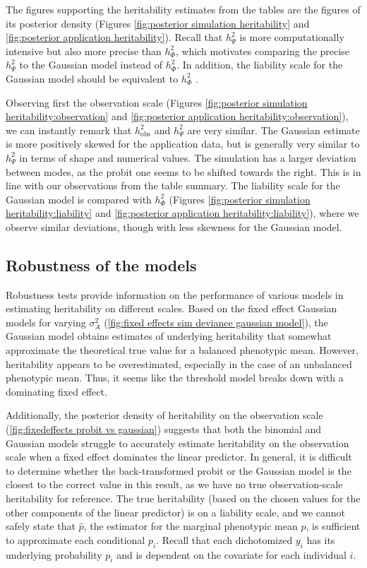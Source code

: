 The figures supporting the heritability estimates from the tables are the figures of its posterior density (Figures \ref{fig:posterior simulation heritability} and \ref{fig:posterior application heritability}). Recall that $h^2_\Psi$ is more computationally intensive but also more precise than $h^2_\Phi$, which motivates comparing the precise $h^2_\Psi$ to the Gaussian model instead of $h^2_\Phi$. In addition, the liability scale for the Gaussian model should be equivalent to $h^2_\Phi$ \autocite{de2016general}.

Observing first the observation scale (Figures \ref{fig:posterior simulation heritability:observation} and \ref{fig:posterior application heritability:observation}), we can instantly remark that $h^2_\text{obs}$ and $h^2_{\Psi}$ are very similar. The Gaussian estimate is more positively skewed for the application data, but is generally very similar to $h^2_\Psi$ in terms of shape and numerical values. The simulation has a larger deviation between modes, as the probit one seems to be shifted towards the right. This is in line with our observations from the table summary. The liability scale for the Gaussian model is compared with $h^2_\Phi$ (Figures \ref{fig:posterior simulation heritability:liability} and \ref{fig:posterior application heritability:liability}), where we observe similar deviations, though with less skewness for the Gaussian model.

\subsection{Robustness of the models}

Robustness tests provide information on the performance of various models in estimating heritability on different scales. Based on the fixed effect Gaussian models for varying $\sigma^2_A$ (\autoref{fig:fixed effects sim deviance gaussian model}), the Gaussian model obtains estimates of underlying heritability that somewhat approximate the theoretical true value for a balanced phenotypic mean. However, heritability appears to be overestimated, especially in the case of an unbalanced phenotypic mean. Thus, it seems like the threshold model breaks down with a dominating fixed effect.

Additionally, the posterior density of heritability on the observation scale (\autoref{fig:fixedeffects probit vs gaussian}) suggests that both the binomial and Gaussian models struggle to accurately estimate heritability on the observation scale when a fixed effect dominates the linear predictor. In general, it is difficult to determine whether the back-transformed probit or the Gaussian model is the closest to the correct value in this result, as we have no true observation-scale heritability for reference. The true heritability (based on the chosen values for the other components of the linear predictor) is on a liability scale, and we cannot safely state that $\hat p$, the estimator for the marginal phenotypic mean $p$, is sufficient to approximate each conditional $p_i$. Recall that each dichotomized $y_i$ has its underlying probability $p_i$ and is dependent on the covariate for each individual $i$.

